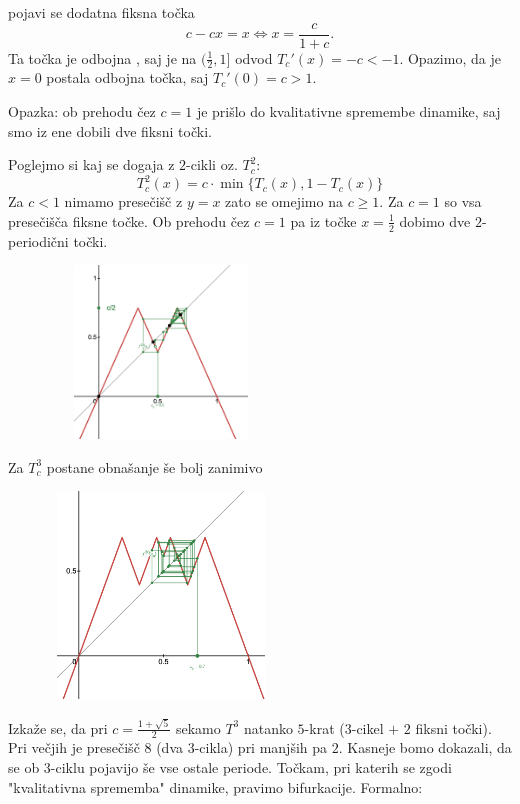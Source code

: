 \documentclass{article}
\begin{document}
\begin{itemize}
pojavi se dodatna fiksna točka 
$$
c - cx = x \iff x = \frac{c}{1 + c}.
$$
Ta točka je odbojna , saj je na $(\frac{1}{2}, 1]$ odvod $T_c'(x) = -c < -1$. 
Opazimo, da je $x = 0$ postala odbojna točka, saj $T_c'(0) = c > 1$.
\end{itemize}
\noindent
Opazka: ob prehodu čez $c=1$ je prišlo do kvalitativne spremembe dinamike, saj 
smo iz ene dobili dve fiksni točki.

\noindent
Poglejmo si kaj se dogaja z $2$-cikli oz. $T_c^2$:
$$
T_c^2(x) = c\cdot \min\{ T_c(x), 1 - T_c(x)\}
$$
Za $c < 1$ nimamo presečišč z $y = x$ zato se omejimo na $c \geq 1$. Za $c=1$
so vsa presečišča fiksne točke. Ob prehodu čez $c = 1$ pa iz točke $x = \frac{1}{2}$
dobimo dve $2$-periodični točki.
\begin{figure}[h!]
    \begin{center}
        \includegraphics[width=6cm, height=4.6cm]{Grafi/cobweb15.png}
    \end{center}
\end{figure}
\noindent
\newpage
Za $T_c^3$ postane obnašanje še bolj zanimivo 
\begin{figure}[h!]
    \begin{center}
        \includegraphics[width=6cm, height=5.5cm]{Grafi/cobweb16.png}
    \end{center}
\end{figure}
Izkaže se, da pri $c = \frac{1 + \sqrt{5}}{2}$ sekamo $T^3$ natanko $5$-krat 
($3$-cikel $+$ $2$ fiksni točki). Pri večjih je presečišč $8$ (dva $3$-cikla) 
pri manjših pa $2$. Kasneje bomo dokazali, da se ob $3$-ciklu pojavijo še vse 
ostale periode.
Točkam, pri katerih se zgodi "kvalitativna sprememba" dinamike, pravimo bifurkacije.
\newline
Formalno:
\end{document}
